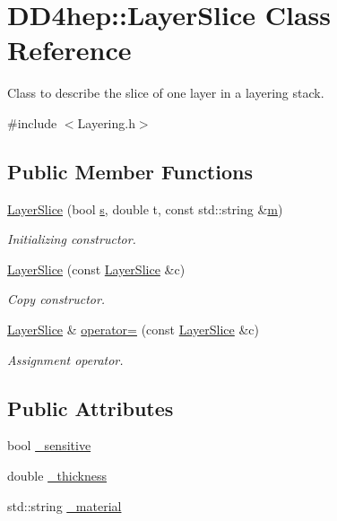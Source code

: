 \hypertarget{class_d_d4hep_1_1_layer_slice}{}\section{D\+D4hep\+:\+:Layer\+Slice Class Reference}
\label{class_d_d4hep_1_1_layer_slice}


Class to describe the slice of one layer in a layering stack.  




{\ttfamily \#include $<$Layering.\+h$>$}

\subsection*{Public Member Functions}
\begin{DoxyCompactItemize}
\item 
\hyperlink{class_d_d4hep_1_1_layer_slice_ae70daa0af493afe9ff51032df8f1a5ca}{Layer\+Slice} (bool \hyperlink{_volumes_8cpp_a17ca6bfc8040d695d3cada22a4763d40}{s}, double t, const std\+::string \&\hyperlink{_volumes_8cpp_a6fc379aaec47ce424b00d8ffda2a6c59}{m})
\begin{DoxyCompactList}\small\item\em Initializing constructor. \end{DoxyCompactList}\item 
\hyperlink{class_d_d4hep_1_1_layer_slice_a9701e10d9e18e708c9f2664149e764fa}{Layer\+Slice} (const \hyperlink{class_d_d4hep_1_1_layer_slice}{Layer\+Slice} \&c)
\begin{DoxyCompactList}\small\item\em Copy constructor. \end{DoxyCompactList}\item 
\hyperlink{class_d_d4hep_1_1_layer_slice}{Layer\+Slice} \& \hyperlink{class_d_d4hep_1_1_layer_slice_a1470bda72281650117b371db0efe485a}{operator=} (const \hyperlink{class_d_d4hep_1_1_layer_slice}{Layer\+Slice} \&c)
\begin{DoxyCompactList}\small\item\em Assignment operator. \end{DoxyCompactList}\end{DoxyCompactItemize}
\subsection*{Public Attributes}
\begin{DoxyCompactItemize}
\item 
bool \hyperlink{class_d_d4hep_1_1_layer_slice_a0fd1f573e7323cd250cf874aca8e2575}{\+\_\+sensitive}
\item 
double \hyperlink{class_d_d4hep_1_1_layer_slice_ab67de3b92d55a6b6169a310c9f18d326}{\+\_\+thickness}
\item 
std\+::string \hyperlink{class_d_d4hep_1_1_layer_slice_a32cd34749a18cc5d57c7a1546f5399fd}{\+\_\+material}
\end{DoxyCompactItemize}



